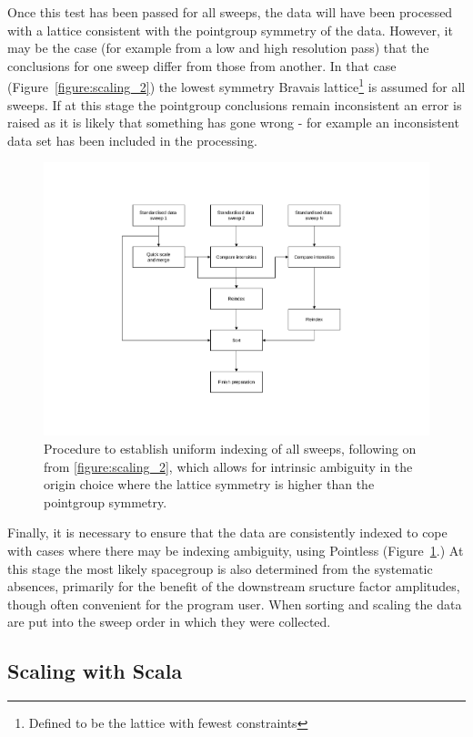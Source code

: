 \documentclass[preprint,pdf]{iucr}
\begin{document}
Once this test has been passed for all sweeps, the data will have been
processed with a lattice consistent with the pointgroup symmetry of
the data. However, it may be the case (for example from a low and high
resolution pass) that the conclusions for one sweep differ from those
from another. In that case (Figure~\ref{figure:scaling_2}) the lowest
symmetry Bravais lattice\footnote{Defined to be the lattice with
  fewest constraints}
is assumed for all sweeps. If at this stage the pointgroup
conclusions remain inconsistent an error is raised as it is likely
that something has gone wrong - for example an inconsistent data set
has been included in the processing. 

\begin{figure}
\caption{Procedure to establish uniform indexing of all sweeps,
following on from \ref{figure:scaling_2}, which allows for intrinsic
ambiguity in the origin choice where the lattice symmetry is higher
than the pointgroup symmetry.
\label{figure:scaling_3}}
\centering
\includegraphics[scale=0.5]{figures/scaling-step-3.pdf}
\end{figure}

Finally, it is necessary to ensure that the data are consistently
indexed to cope with cases where there may be indexing ambiguity,
using Pointless (Figure~\ref{figure:scaling_3}.) At this stage the
most likely
spacegroup is also determined from the systematic absences, primarily
for the benefit of the downstream sructure factor amplitudes, though
often convenient for the program user. When sorting and scaling the
data are put into the sweep order in which they were collected.

\subsection{Scaling with Scala}
\end{document}
